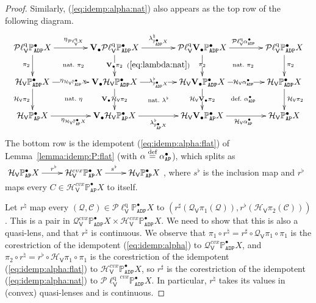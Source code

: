 \documentclass[preprint,12pt]{elsarticle}
\newcommand\eqdef{\mathrel{\buildrel \text{def}\over=}}
\newcommand\Pred{\mathbb{P}}
\newcommand\Angel{{\mathtt{A}}}
\newcommand\Demon{{\mathtt{D}}}
\newcommand\Nature{{\mathtt{P}}}
\newcommand\AN{{\Angel\Nature}}
\newcommand\ADN{{\Angel\Demon\Nature}}
\newcommand\Smyth{{\mathcal Q}}
\newcommand\Hoare{{\mathcal H}}
\newcommand\Vt{\mathsf{V}}
\newcommand\HV{\Hoare_\Vt}
\newcommand\SV{\Smyth_{\Vt}}
\newcommand\quasi{\mathrm{q}} %
\newcommand\QL{\Plotkin^\quasi}
\newcommand\QLV{\QL_\Vt}
\newcommand\Plotkin{\mathcal P\ell} %
\newcommand\Val{{\mathbf V}}
\begin{document}
\begin{proof}
  Similarly, (\ref{eq:idemp:alpha:nat}) also appears as the top row of
  the following diagram.
  \[
    \xymatrix@C+15pt{
      \QLV {\Pred_\ADN^\bullet X} \ar[r]^{\eta_{\QLV X}}
      \ar[d]_{\pi_2}
      \ar@{}[rd]|{\text{nat.\ $\pi_2$}}
      & \Val_\bullet {\QLV {\Pred_\ADN^\bullet X}}
      \ar[r]^{\lambda^\natural_{\Pred_\ADN^\bullet X}}
      \ar[d]|{\Val_\bullet {\pi_2}}
      \ar@{}[rd]|{(\ref{eq:lambda:nat})}
      & \QLV {\Val_\bullet {\Pred_\ADN^\bullet X}}
      \ar[r]^{\QLV {\alpha_\ADN^\bullet}}
      \ar[d]|{\pi_2}
      \ar@{}[rd]|{\text{nat.\ $\pi_2$}}
      & \QLV {\Pred_\ADN^\bullet X}
      \ar[d]^{\pi_2}
      \\
      \HV {\Pred_\ADN^\bullet X}
      \ar[r]|{\eta_{\HV {\Pred_\ADN^\bullet X}}}
      \ar[d]_{\HV {\pi_2}}
      \ar@{}[rd]|{\text{nat.\ $\eta$}}
      &
      \Val_\bullet {\HV {\Pred_\ADN^\bullet X}}
      \ar[r]|{\lambda^\flat_{\Pred_\ADN^\bullet X}}
      \ar[d]|{\Val_\bullet {\HV {\pi_2}}}
      \ar@{}[rd]|{\text{nat.\ $\lambda^\flat$}}
      &
      \HV {\Val_\bullet {\Pred_\ADN^\bullet X}}
      \ar[r]|{\HV {\alpha_\ADN^\bullet}}
      \ar[d]|{\HV {\Val_\bullet {\pi_2}}}
      \ar@{}[rd]|{\text{def.\ $\alpha_\ADN^\bullet$}}
      &
      \HV {\Pred_\ADN^\bullet X}
      \ar[d]^{\HV {\pi_2}}
      \\
      \HV {\Pred_\AN^\bullet X}
      \ar[r]_{\eta_{\HV {\Pred_\AN^\bullet X}}}
      &
      \Val_\bullet {\HV {\Pred_\AN^\bullet X}}
      \ar[r]_{\lambda^\flat_{\Pred_\AN^\bullet X}}
      &
      \HV {\Val_\bullet {\Pred_\AN^\bullet X}}
      \ar[r]_{\HV {\alpha_\AN^\bullet}}
      &
      \HV {\Pred_\AN^\bullet X}
    }
  \]
  The bottom row is the idempotent (\ref{eq:idemp:alpha:flat}) of
  Lemma~\ref{lemma:idemp:P:flat} (with
  $\alpha \eqdef \alpha_\AN^\bullet$), which splits as
  $\xymatrix{\HV {\Pred_\AN^\bullet X} \ar[r]^{r^\flat} & \HV^{cvx}
    {\Pred_\AN^\bullet X} \ar[r]^{s^\flat} & \HV {\Pred_\AN^\bullet
      X}}$, where $s^\flat$ is the inclusion map and $r^\flat$ maps
  every $C \in \HV^{cvx} {\Pred_\AN^\bullet X}$ to itself.

  Let $r^\natural$ map every
  $(\mathcal Q, \mathcal C) \in \QLV {\Pred_\ADN^\bullet X}$ to
  $(r^\sharp (\SV {\pi_1} (\mathcal Q)), r^\flat (\HV {\pi_2}
  (\mathcal C)))$.  This is a pair in
  $\SV^{cvx} {\Pred_\ADN^\bullet X} \times \HV^{cvx}
  {\Pred_\ADN^\bullet X}$.  We need to show that this is also a
  quasi-lens, and that $r^\natural$ is continuous.  We observe that
  $\pi_1 \circ r^\natural = r^\sharp \circ \SV {\pi_1} \circ \pi_1$ is
  the corestriction of the idempotent (\ref{eq:idemp:alpha}) to
  $\SV^{cvx} {\Pred_\ADN^\bullet X}$, and
  $\pi_2 \circ r^\natural = r^\flat \circ \HV {\pi_1} \circ \pi_1$ is
  the corestriction of the idempotent (\ref{eq:idemp:alpha:flat}) to
  $\HV^{cvx} {\Pred_\ADN^\bullet X}$, so $r^\sharp$ is the
  corestriction of the idempotent (\ref{eq:idemp:alpha:nat}) to
  ${\QLV}^{cvx} {\Pred_\ADN^\bullet X}$.  In particular, $r^\natural$
  takes its values in (convex) quasi-lenses and is continuous.


\end{proof}
\end{document}

